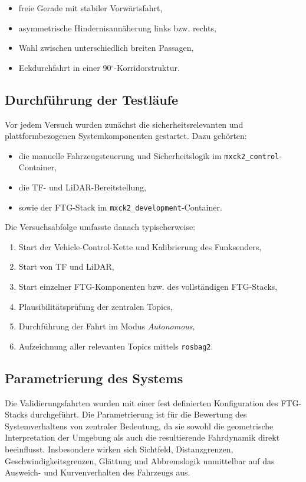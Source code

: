 \begin{itemize}
    \item freie Gerade mit stabiler Vorwärtsfahrt,
    \item asymmetrische Hindernisannäherung links bzw. rechts,
    \item Wahl zwischen unterschiedlich breiten Passagen,
    \item Eckdurchfahrt in einer 90$^\circ$-Korridorstruktur.
\end{itemize}

\subsection{Durchführung der Testläufe}

Vor jedem Versuch wurden zunächst die sicherheitsrelevanten und plattformbezogenen Systemkomponenten gestartet. Dazu gehörten:

\begin{itemize}
    \item die manuelle Fahrzeugsteuerung und Sicherheitslogik im \texttt{mxck2\_control}-Container,
    \item die TF- und LiDAR-Bereitstellung,
    \item sowie der FTG-Stack im \texttt{mxck2\_development}-Container.
\end{itemize}

Die Versuchsabfolge umfasste danach typischerweise:

\begin{enumerate}
    \item Start der Vehicle-Control-Kette und Kalibrierung des Funksenders,
    \item Start von TF und LiDAR,
    \item Start einzelner FTG-Komponenten bzw. des vollständigen FTG-Stacks,
    \item Plausibilitätsprüfung der zentralen Topics,
    \item Durchführung der Fahrt im Modus \textit{Autonomous},
    \item Aufzeichnung aller relevanten Topics mittels \texttt{rosbag2}.
\end{enumerate}

\subsection{Parametrierung des Systems}
\label{sec:parametrierung_system}

Die Validierungsfahrten wurden mit einer fest definierten Konfiguration des FTG-Stacks durchgeführt. Die Parametrierung ist für die Bewertung des Systemverhaltens von zentraler Bedeutung, da sie sowohl die geometrische Interpretation der Umgebung als auch die resultierende Fahrdynamik direkt beeinflusst. Insbesondere wirken sich Sichtfeld, Distanzgrenzen, Geschwindigkeitsgrenzen, Glättung und Abbremslogik unmittelbar auf das Ausweich- und Kurvenverhalten des Fahrzeugs aus.

